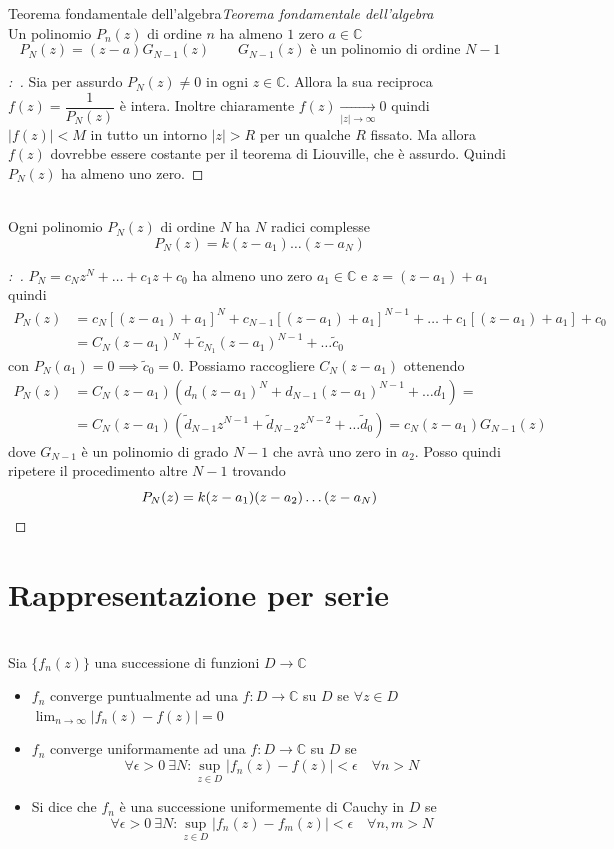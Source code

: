 \documentclass[11pt,a4paper,twoside]{book}
\newenvironment{teorema}[1][\empty]{\begin{Teorema}{
\ifx\empty#1\relax\else\mdseries\itshape#1\\\fi
}{}}{\end{Teorema}}
\newenvironment{definizione}[1][\empty]{\begin{Definizione}{
\ifx\empty#1\relax\else\mdseries\itshape#1\\\fi
}{}}{\end{Definizione}}
\newenvironment{corollario}[1][\empty]{\begin{Corollario}{
\ifx\empty#1\relax\else\mdseries\itshape#1\\\fi
}{}}{\end{Corollario}}
\newenvironment{dimo}[1][\proofname]{
	\begin{tcolorbox}[
	breakable, 
	enhanced, 
	interior hidden, 
	frame hidden, 
	borderline west = {1pt}{0pt}{gray}, 
	top=0pt, bottom=0pt, left=0pt]
\begin{proof}[#1:~]
}
{
\end{proof}
\end{tcolorbox}
}
\theoremstyle{esss}
\theoremstyle{dotless}
\numberwithin{equation}{section} %
\begin{document}
\begin{teorema}[Teorema fondamentale dell'algebra]
Un polinomio $P_n(z)$ di ordine $n$ ha almeno $1$ zero $a\in\mathbb{C}$ 
\[
P_N(z)=(z-a)G_{N-1}(z) \qquad G_{N-1}(z)\text{ è un polinomio di ordine } N-1
\]
\end{teorema}
\begin{dimo}
Sia per assurdo $P_N(z)\neq 0$ in ogni $z\in\mathbb{C}$. Allora la sua reciproca $f(z)=\dfrac{1}{P_N(z)}$ è intera.
Inoltre chiaramente $f(z)\underset{|z|\rightarrow \infty}{\longrightarrow} 0$ quindi $|f(z)|<M$ in tutto un intorno $|z|>R$ per un qualche $R$ fissato. Ma allora $f(z)$ dovrebbe essere costante per il teorema di Liouville, che è assurdo.
Quindi $P_N(z)$ ha almeno uno zero.
\end{dimo}
\begin{corollario}
Ogni polinomio $P_N(z)$ di ordine $N$ ha $N$ radici complesse 
\[
P_N(z)=k (z-a_1) \dots (z-a_N)
\]
\end{corollario}
\begin{dimo}
$P_N=c_N z^N +\dots + c_1 z + c_0$ ha almeno uno zero $a_1\in\mathbb{C}$ e $z=(z-a_1)+a_1$ quindi
\begin{align*}
P_N(z) &=c_N [(z-a_1)+a_1]^N +c_{N-1} [(z-a_1)+a_1]^{N-1}+\dots + c_1 [(z-a_1)+a_1] + c_0 \\ &= C_N (z-a_1)^N + \tilde{c}_{N_1} (z-a_1)^{N-1} + \dots \tilde{c}_0
\end{align*}
con $P_N(a_1)=0 \implies \tilde{c}_0=0$. Possiamo raccogliere  $C_N(z-a_1)$ ottenendo
\begin{align*}
P_N(z) &= C_N (z-a_1) \left(d_n (z-a_1)^N + d_{N-1} (z-a_1)^{N-1} + \dots d_1 \right) = \\ & = C_N (z-a_1) \left(\tilde{d}_{N-1} z^{N-1} + \tilde{d}
_{N-2} z^{N-2} + \dots \tilde{d}_0 \right)= c_N (z-a_1) G_{N-1}(z)
\end{align*}
dove $G_{N-1}$ è un polinomio di grado $N-1$ che avrà uno zero in $a_2$. Posso quindi ripetere il procedimento altre $N-1$ trovando
\[
P_N(z)=k (z-a_1)(z-a_2)\dots (z-a_N) \qedhere
\]
\end{dimo}
\section{Rappresentazione per serie}

\begin{definizione}
Sia $\{f_n(z)\}$ una successione di funzioni $D\rightarrow\mathbb{C}$\begin{itemize}[label=$\cdot$]
\item $f_n$ converge puntualmente ad una $f:D\rightarrow\mathbb{C}$ su $D$ se $\forall z\in D$ $\lim_{n\rightarrow\infty}|f_n(z)-f(z)|=0$
\item $f_n$ converge uniformamente ad una $f:D\rightarrow\mathbb{C}$ su $D$ se 
\[
\forall \epsilon>0 \> \exists N : \sup_{z\in D} |f_n(z)-f(z)| <\epsilon \quad \forall n>N
\]
\item Si dice che $f_n$ è una successione uniformemente di Cauchy in $D$ se
\[
\forall \epsilon>0 \>\exists N : \sup_{z\in D}|f_n(z)-f_m(z)|<\epsilon \quad \forall n,m>N
\]
\end{itemize}
\end{definizione}
\end{document}
